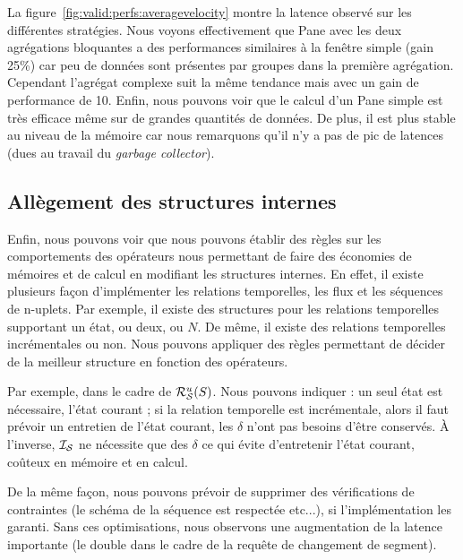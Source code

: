 La figure~\ref{fig:valid:perfs:averagevelocity} montre la latence observé sur les différentes stratégies. Nous voyons effectivement que Pane avec les deux agrégations bloquantes a des performances similaires à la fenêtre simple (gain 25\%) car peu de données sont présentes par groupes dans la première agrégation. Cependant l'agrégat complexe suit la même tendance mais avec un gain de performance de 10. Enfin, nous pouvons voir que le calcul d'un Pane simple est très efficace même sur de grandes quantités de données. De plus, il est plus stable au niveau de la mémoire car nous remarquons qu'il n'y a pas de pic de latences (dues au travail du \textit{garbage collector}).

\subsection{Allègement des structures internes}
Enfin, nous pouvons voir que nous pouvons établir des règles sur les comportements des opérateurs nous permettant de faire des économies de mémoires et de calcul en modifiant les structures internes. En effet, il existe plusieurs façon d'implémenter les relations temporelles, les flux et les séquences de n-uplets. Par exemple, il existe des structures pour les relations temporelles supportant un état, ou deux, ou $N$. De même, il existe des relations temporelles incrémentales ou non. Nous pouvons appliquer des règles permettant de décider de la meilleur structure en fonction des opérateurs.

Par exemple, dans le cadre de $\mathcal{R}_{\mathcal S}^{u}(S)$. Nous pouvons indiquer : un seul état est nécessaire, l'état courant ; si la relation temporelle est incrémentale, alors il faut prévoir un entretien de l'état courant, les $\delta$ n'ont pas besoins d'être conservés. À l'inverse, $\mathcal{I_S}$ ne nécessite que des $\delta$ ce qui évite d'entretenir l'état courant, coûteux en mémoire et en calcul.

De la même façon, nous pouvons prévoir de supprimer des vérifications de contraintes (le schéma de la séquence est respectée etc...), si l'implémentation les garanti. Sans ces optimisations, nous observons une augmentation de la latence importante (le double dans le cadre de la requête de changement de segment).
